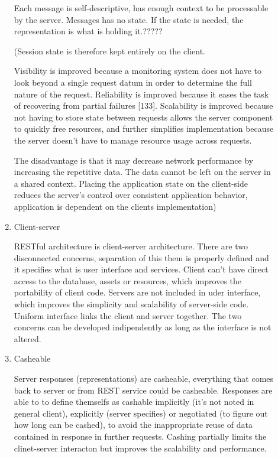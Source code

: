\begin{description}
\begin{enumerate}
Each message is self-descriptive, has enough context to be processable by the server. Messages has no state. If the state is needed, the representation is what is holding it.?????

(Session state is therefore kept entirely on the client.

Visibility is improved because a monitoring system does not have to look beyond a single request datum in order to determine the full nature of the request. Reliability is improved because it eases the task of recovering from partial failures [133]. Scalability is improved because not having to store state between requests allows the server component to quickly free resources, and further simplifies implementation because the server doesn't have to manage resource usage across requests.

The disadvantage is that it may decrease network performance by increasing the repetitive data. The data cannot be left on the server in a shared context. Placing the application state on the client-side reduces the server's control over consistent application behavior, application is dependent on the clients implementation) %

\item Client-server

RESTful architecture is client-server architecture. There are two disconnected concerns, separation of this them is properly defined and it specifies what is user interface and services. Client can’t have direct access to the database, assets or resources, which improves the portability of client code. Servers are not included in uder interface, which improves the simplicity and scalability of server-side code. Uniform interface links the client and server together. The two concerns can be developed indipendently as long as the interface is not altered. 

\item Casheable

Server responses (representations) are casheable, everything that comes back to server or from REST service could be casheable. Responses are able to to define themselfs as cashable implicitly (it’s not noted in general client), explicitly (server specifies) or negotiated (to figure out how long can be cashed), to avoid the inappropriate reuse of data contained in response in further requests. Cashing partially limits the clinet-server interacton but improves the scalability and performance.


\end{enumerate}
\end{description}
